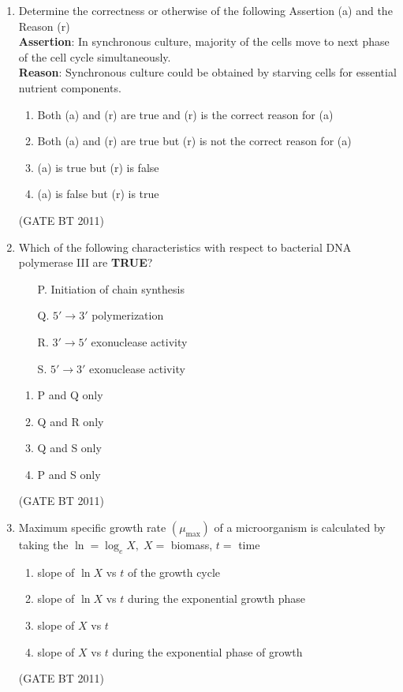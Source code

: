 \documentclass[journal,12pt,onecolumn]{IEEEtran}
\begin{document}
\begin{enumerate}
  \item Determine the correctness or otherwise of the following Assertion (a) and the Reason (r) \\
  \textbf{Assertion}: In synchronous culture, majority of the cells move to next phase of the cell cycle simultaneously. \\
  \textbf{Reason}: Synchronous culture could be obtained by starving cells for essential nutrient components.

    \begin{enumerate}
      \item Both (a) and (r) are true and (r) is the correct reason for (a)
      \item Both (a) and (r) are true but (r) is not the correct reason for (a)
      \item (a) is true but (r) is false
      \item (a) is false but (r) is true
    \end{enumerate}
 \hfill(GATE BT 2011)
    

  \item Which of the following characteristics with respect to bacterial DNA polymerase III are \textbf{TRUE}?
  \begin{enumerate}
    \item[P.] Initiation of chain synthesis
    \item[Q.] $5' \to 3'$ polymerization
    \item[R.] $3' \to 5'$ exonuclease activity
    \item[S.] $5' \to 3'$ exonuclease activity
  \end{enumerate}

  \begin{multicols}{2}
    \begin{enumerate}
      \item P and Q only
      \item Q and R only
      \item Q and S only
      \item P and S only
    \end{enumerate}
  \end{multicols} \hfill(GATE BT 2011)

  \item Maximum specific growth rate $(\mu_{\max})$ of a microorganism is calculated by taking the 
  $\ln = \log_e X, \; X =$ biomass, $t =$ time
    \begin{enumerate}
      \item slope of $\ln X$ vs $t$ of the growth cycle
      \item slope of $\ln X$ vs $t$ during the exponential growth phase
      \item slope of $X$ vs $t$
      \item slope of $X$ vs $t$ during the exponential phase of growth
    \end{enumerate}
    \hfill(GATE BT 2011)


\end{enumerate}
\end{document}
